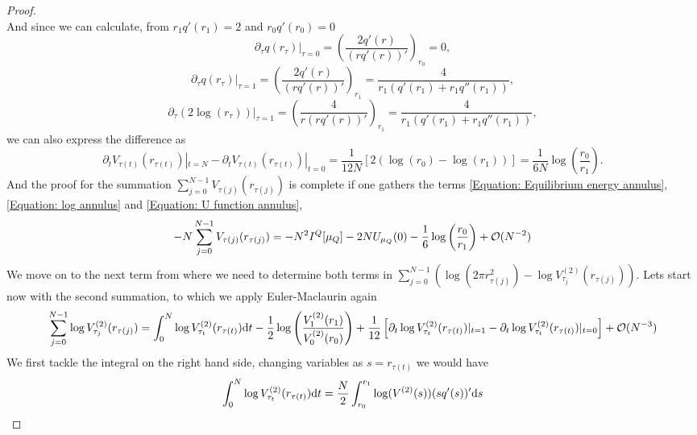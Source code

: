 \begin{proof}
\begin{equation}
\end{equation}
And since we can calculate, from $r_1 q'(r_1) = 2$ and $r_0 q'(r_0) = 0$
\begin{equation}
	\partial_\tau q(r_{\tau}) |_{\tau = 0} = \left( \frac{2 q'(r)}{(r q'(r))'}\right)_{r_0} = 0,
\end{equation}
\begin{equation}
	\partial_\tau q(r_{\tau}) |_{\tau = 1} = \left( \frac{2 q'(r)}{(r q'(r))'}\right)_{r_1} = \frac{4}{r_1(q'(r_1) + r_1 q''(r_1))},
\end{equation}
\begin{equation}
	\partial_\tau (2 \log(r_\tau)) |_{\tau = 1} = \left( \frac{4}{r (r q'(r))'}\right)_{r_1} = \frac{4}{r_1(q'(r_1) + r_1 q''(r_1))},
\end{equation}
we can also express the difference as
\begin{equation}
	\partial_t V_{\tau(t)}(r_{\tau(t)})|_{t=N}  - \partial_t V_{\tau(t)}(r_{\tau(t)})|_{t=0} = \frac{1}{12 N} \left[ 2 (\log(r_0) - \log(r_1)) \right] = \frac{1}{6 N} \log\left(\frac{r_0}{r_1}\right) .
	\label{Equation: log annulus}
\end{equation}
And the proof for the summation $\sum_{j=0}^{N-1} V_{\tau(j)}(r_{\tau(j)})$ is complete if one gathers the terms \eqref{Equation: Equilibrium energy annulus}, \eqref{Equation: log annulus} and \eqref{Equation: U function annulus},
\begin{equation}
	- N \sum_{j=0}^{N-1} V_{\tau(j)}(r_{\tau(j)}) = - N^2 I^Q[\mu_Q] - 2 N U_{\mu_Q}(0) - \frac{1}{6} \log{\left( \frac{r_0}{r_1}\right)} + \mathcal{O}(N^{-2})
	\label{Equation: sum V annulus}
\end{equation}
We move on to the next term from where we need to determine both terms in $ \sum_{j=0}^{N-1}\left(\log(2\pi r^2_{\tau(j)}) - \log V^{(2)}_{\tau_j}(r_{\tau(j)}) \right)$. Lets start now with the second summation, to which we apply Euler-Maclaurin again
\begin{equation}
	\sum_{j=0}^{N-1}  \log V^{(2)}_{\tau_j}(r_{\tau(j)}) = \int_{0}^{N} \log V^{(2)}_{\tau_t}(r_{\tau(t)}) \mathrm{d} t - \frac{1}{2} \log \left( \frac{V^{(2)}_{1}(r_1)}{V^{(2)}_{0}(r_{0})} \right) + \frac{1}{12} \left[ \partial_t \log V^{(2)}_{\tau_t}(r_{\tau(t)}) |_{t=1} - \partial_t \log V^{(2)}_{\tau_t}(r_{\tau(t)}) |_{t=0}\right]  + \mathcal{O}(N^{-3})
\end{equation}
We first tackle the integral on the right hand side, changing variables as $s = r_{\tau(t)}$ we would have
\begin{equation}
	\int_{0}^{N} \log V^{(2)}_{\tau_t}(r_{\tau(t)}) \dd t = \frac{N}{2} \int_{r_0}^{r_1} \log(V^{(2)}(s)) (sq'(s))' \dd s \\

\end{equation}
\end{proof}
